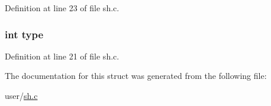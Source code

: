 Definition at line 23 of file sh.\-c.

\hypertarget{structexeccmd_ac765329451135abec74c45e1897abf26}{
\subsubsection[{type}]{\setlength{\rightskip}{0pt plus 5cm}int type}}\label{structexeccmd_ac765329451135abec74c45e1897abf26}


Definition at line 21 of file sh.\-c.



The documentation for this struct was generated from the following file\-:\begin{DoxyCompactItemize}
\item 
user/\hyperlink{sh_8c}{sh.\-c}\end{DoxyCompactItemize}
